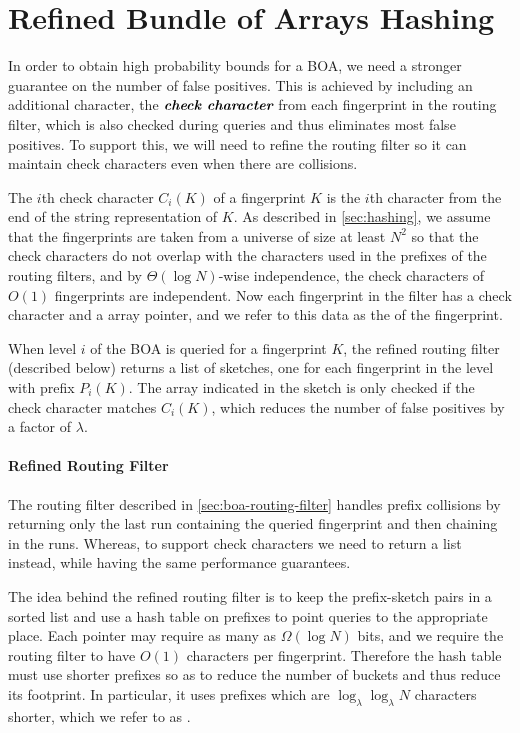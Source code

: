 \section{Refined Bundle of Arrays Hashing}\label{sec:boa-refined}

In order to obtain high probability bounds for a BOA, we need a stronger
guarantee on the number of false positives. This is achieved by including an
additional character, the $\emph{\textbf{\boldmath check character}}$ from each fingerprint in the
routing filter, which is also checked during queries and thus eliminates most
false positives.  To support this, we will need to refine the routing filter so
it can maintain check characters even when there are collisions.

The $i$th check character $C_i(K)$ of a fingerprint $K$ is the $i$th character
from the end of the string representation of $K$. As described in
\cref{sec:hashing}, we assume that the fingerprints are taken from a universe
of size at least $N^2$ so that the check characters do not overlap with the
characters used in the prefixes of the routing filters, and by $\Theta(\log
N)$-wise independence, the check characters of $O(1)$ fingerprints are
independent. Now each fingerprint in the filter has a check character and a
array pointer, and we refer to this data as the  of the
fingerprint.

When level $i$ of the BOA is queried for a fingerprint $K$, the refined routing
filter (described below) returns a list of sketches, one for each fingerprint
in the level with prefix $P_i(K)$. The array indicated in the sketch is only
checked if the check character matches $C_i(K)$, which reduces the number of
false positives by a factor of $\lambda$.

\paragraph{Refined Routing Filter}
The routing filter described in \cref{sec:boa-routing-filter} handles prefix
collisions by returning only the last run containing the queried fingerprint
and then chaining in the runs. Whereas, to support check characters we need to
return a list instead, while having the same performance guarantees.

The idea behind the refined routing filter is to keep the prefix-sketch pairs
in a sorted list and use a hash table on prefixes to point queries to the
appropriate place. Each pointer may require as many as $\Omega(\log N)$ bits,
and we require the routing filter to have $O(1)$ characters per fingerprint.
Therefore the hash table must use shorter prefixes so as to reduce the number
of buckets and thus reduce its footprint. In particular, it uses prefixes which
are $\log_\lambda\log_\lambda N$ characters shorter, which we refer to as
.


